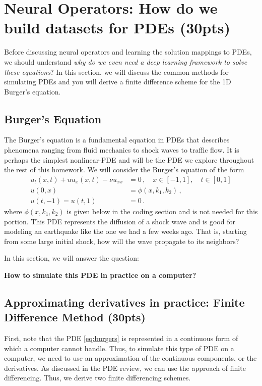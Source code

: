 \documentclass[12pt,letterpaper, onecolumn]{exam}
\theoremstyle{definition}
\begin{document}
\section{Neural Operators: How do we build datasets for PDEs (30pts)}
Before discussing neural operators and learning the solution mappings to PDEs, we should understand \emph{why do we even need a deep learning framework to solve these equations}? In this section, we will discuss the common methods for simulating PDEs and you will derive a finite difference scheme for the 1D Burger's equation. 

\subsection{Burger's Equation}
The Burger's equation is a fundamental equation in PDEs that describes phenomena ranging from fluid mechanics to shock waves to traffic flow. It is perhaps the simplest nonlinear-PDE and will be the PDE we explore throughout the rest of this homework. We will consider the Burger's equation of the form
\begin{subequations}\label{eq:burgers}
    \begin{align}
    u_t(x, t) + u u_x(x, t) - \nu u_{xx} &= 0\,, \quad x \in [-1, 1]
, \quad t \in [0, 1 ] 
\\  
u(0, x) &= \phi(x, k_1, k_2)\,, \\
u(t, -1) = u(t, 1) &= 0\,. \label{eq:burgers_bc} 
\end{align}
\end{subequations}
where $\phi(x, k_1, k_2)$ is given below in the coding section and is not needed for this portion. This PDE represents the diffusion of a shock wave and is good for modeling an earthquake like the one we had a few weeks ago. That is, starting from some large initial shock, how will the wave propagate to its neighbors? 

\color{black}

In this section, we will answer the question:
\begin{tcolorbox} \centering
\textbf{How to simulate this PDE in practice on a computer?}
\end{tcolorbox}

\subsection{Approximating derivatives in practice: Finite Difference Method (30pts)}
First, note that the PDE \eqref{eq:burgers} is represented in a continuous form of which a computer cannot handle. Thus, to simulate this type of PDE on a computer, we need to use an approximation of the continuous components, or the derivatives. As discussed in the PDE review, we can use the approach of finite differencing. Thus, we derive two finite differencing schemes. 
\end{document}
